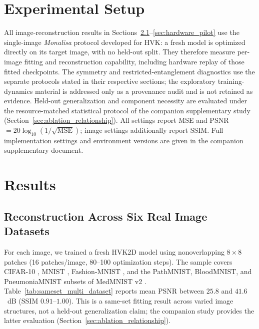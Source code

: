 \documentclass[11pt]{article}
\begin{document}
\begin{table}[t]
\centering
\caption{HVK variants tested in this paper.}
\label{tab:variants}
\scriptsize
{}
\end{table}

\section{Experimental Setup}
\label{sec:protocol}
All image-reconstruction results in Sections~\ref{sec:sameset_results}--\ref{sec:hardware_pilot} use the single-image \textit{Monalisa} protocol developed for HVK: a fresh model is optimized directly on its target image, with no held-out split. They therefore measure per-image fitting and reconstruction capability, including hardware replay of those fitted checkpoints. The symmetry and restricted-entanglement diagnostics use the separate protocols stated in their respective sections; the exploratory training-dynamics material is addressed only as a provenance audit and is not retained as evidence. Held-out generalization and component necessity are evaluated under the resource-matched statistical protocol of the companion supplementary study (Section~\ref{sec:ablation_relationship}). All settings report MSE and PSNR $=20\log_{10}(1/\sqrt{\mathrm{MSE}})$; image settings additionally report SSIM. Full implementation settings and environment versions are given in the companion supplementary document.

\section{Results}
\label{sec:results}

\subsection{Reconstruction Across Six Real Image Datasets}
\label{sec:sameset_results}
For each image, we trained a fresh HVK2D model using nonoverlapping $8\times8$ patches (16 patches/image, 80--100 optimization steps). The sample covers CIFAR-10 \cite{Krizhevsky2009}, MNIST \cite{LeCun1998}, Fashion-MNIST \cite{Xiao2017}, and the PathMNIST, BloodMNIST, and PneumoniaMNIST subsets of MedMNIST v2 \cite{Yang2023}. Table~\ref{tab:sameset_multi_dataset} reports mean PSNR between $25.8$ and $41.6$~dB (SSIM $0.91$--$1.00$). This is a same-set fitting result across varied image structures, not a held-out generalization claim; the companion study provides the latter evaluation (Section~\ref{sec:ablation_relationship}).
\end{document}
